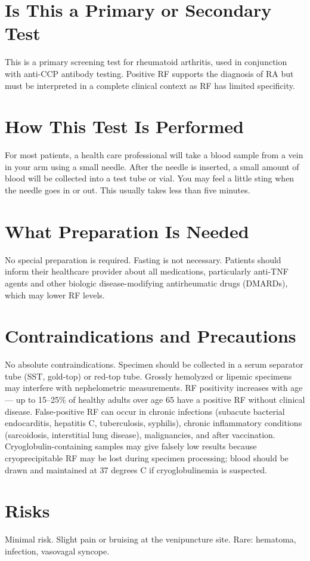 \section*{Is This a Primary or Secondary Test}
This is a primary screening test for rheumatoid arthritis, used in conjunction with anti-CCP antibody testing. Positive RF supports the diagnosis of RA but must be interpreted in a complete clinical context as RF has limited specificity.

\section*{How This Test Is Performed}
For most patients, a health care professional will take a blood sample from a vein in your arm using a small needle. After the needle is inserted, a small amount of blood will be collected into a test tube or vial. You may feel a little sting when the needle goes in or out. This usually takes less than five minutes.

\section*{What Preparation Is Needed}
No special preparation is required. Fasting is not necessary. Patients should inform their healthcare provider about all medications, particularly anti-TNF agents and other biologic disease-modifying antirheumatic drugs (DMARDs), which may lower RF levels.

\section*{Contraindications and Precautions}
No absolute contraindications. Specimen should be collected in a serum separator tube (SST, gold-top) or red-top tube. Grossly hemolyzed or lipemic specimens may interfere with nephelometric measurements. RF positivity increases with age --- up to 15--25\% of healthy adults over age 65 have a positive RF without clinical disease. False-positive RF can occur in chronic infections (subacute bacterial endocarditis, hepatitis C, tuberculosis, syphilis), chronic inflammatory conditions (sarcoidosis, interstitial lung disease), malignancies, and after vaccination. Cryoglobulin-containing samples may give falsely low results because cryoprecipitable RF may be lost during specimen processing; blood should be drawn and maintained at 37 degrees C if cryoglobulinemia is suspected.

\section*{Risks}
Minimal risk. Slight pain or bruising at the venipuncture site. Rare: hematoma, infection, vasovagal syncope.

